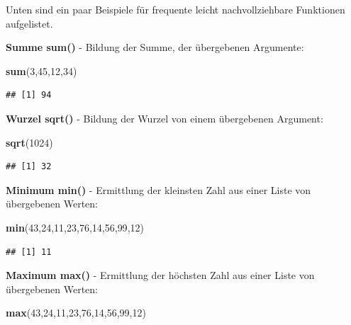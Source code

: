 \documentclass[]{book}
\newenvironment{Shaded}{\begin{snugshade}}{\end{snugshade}}
\newcommand{\KeywordTok}[1]{\textcolor[rgb]{0.13,0.29,0.53}{\textbf{#1}}}
\newcommand{\DecValTok}[1]{\textcolor[rgb]{0.00,0.00,0.81}{#1}}
\newcommand{\NormalTok}[1]{#1}
\begin{document}
Unten sind ein paar Beispiele für frequente leicht nachvollziehbare
Funktionen aufgelistet.

\textbf{Summe sum()} - Bildung der Summe, der übergebenen Argumente:

\begin{Shaded}
\begin{Highlighting}[]
\KeywordTok{sum}\NormalTok{(}\DecValTok{3}\NormalTok{,}\DecValTok{45}\NormalTok{,}\DecValTok{12}\NormalTok{,}\DecValTok{34}\NormalTok{)}
\end{Highlighting}
\end{Shaded}

\begin{verbatim}
## [1] 94
\end{verbatim}

\textbf{Wurzel sqrt()} - Bildung der Wurzel von einem übergebenen
Argument:

\begin{Shaded}
\begin{Highlighting}[]
\KeywordTok{sqrt}\NormalTok{(}\DecValTok{1024}\NormalTok{)}
\end{Highlighting}
\end{Shaded}

\begin{verbatim}
## [1] 32
\end{verbatim}

\textbf{Minimum min()} - Ermittlung der kleinsten Zahl aus einer Liste
von übergebenen Werten:

\begin{Shaded}
\begin{Highlighting}[]
\KeywordTok{min}\NormalTok{(}\DecValTok{43}\NormalTok{,}\DecValTok{24}\NormalTok{,}\DecValTok{11}\NormalTok{,}\DecValTok{23}\NormalTok{,}\DecValTok{76}\NormalTok{,}\DecValTok{14}\NormalTok{,}\DecValTok{56}\NormalTok{,}\DecValTok{99}\NormalTok{,}\DecValTok{12}\NormalTok{)}
\end{Highlighting}
\end{Shaded}

\begin{verbatim}
## [1] 11
\end{verbatim}

\textbf{Maximum max()} - Ermittlung der höchsten Zahl aus einer Liste
von übergebenen Werten:

\begin{Shaded}
\begin{Highlighting}[]
\KeywordTok{max}\NormalTok{(}\DecValTok{43}\NormalTok{,}\DecValTok{24}\NormalTok{,}\DecValTok{11}\NormalTok{,}\DecValTok{23}\NormalTok{,}\DecValTok{76}\NormalTok{,}\DecValTok{14}\NormalTok{,}\DecValTok{56}\NormalTok{,}\DecValTok{99}\NormalTok{,}\DecValTok{12}\NormalTok{)}
\end{Highlighting}
\end{Shaded}
\end{document}
